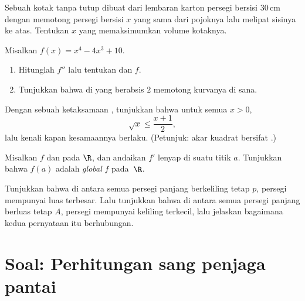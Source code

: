 \begin{exercise}[$\star\star$]\label{exo:g12:deriv:5}
Sebuah kotak tanpa tutup dibuat dari lembaran karton persegi bersisi
$30\,$cm dengan memotong persegi bersisi $x$ yang sama dari pojoknya lalu
melipat sisinya ke atas. Tentukan $x$ yang memaksimumkan volume kotaknya.
\end{exercise}

\begin{exercise}[$\star\star$]\label{exo:g12:deriv:6}
Misalkan $f(x) = x^4 - 4x^3 + 10$.
\begin{enumerate}
  \item Hitunglah $f''$ lalu tentukan   dan 
        $f$.
  \item Tunjukkan bahwa  di  yang berabsis $2$
        memotong kurvanya di sana.
\end{enumerate}
\end{exercise}

\begin{exercise}[$\star\star$]\label{exo:g12:deriv:7}
Dengan sebuah ketaksamaan , tunjukkan bahwa untuk semua $x > 0$,
\[
\sqrt{x} \leq \frac{x + 1}{2},
\]
lalu kenali kapan kesamaannya berlaku. (Petunjuk: akar kuadrat bersifat .)
\end{exercise}

\begin{exercise}[$\star\star\star$]\label{exo:g12:deriv:8}
Misalkan $f$  dan  pada $\R$, dan andaikan $f'$ lenyap
di suatu titik $a$. Tunjukkan bahwa $f(a)$ adalah  \emph{global} $f$
pada~$\R$.
\end{exercise}

\begin{exercise}[$\star\star\star$]\label{exo:g12:deriv:9}
Tunjukkan bahwa di antara semua persegi panjang berkeliling tetap $p$, persegi
mempunyai luas terbesar. Lalu tunjukkan bahwa di antara semua persegi panjang
berluas tetap $A$, persegi mempunyai keliling terkecil, lalu jelaskan bagaimana
kedua pernyataan itu berhubungan.
\end{exercise}

\section{Soal: Perhitungan sang penjaga pantai}

